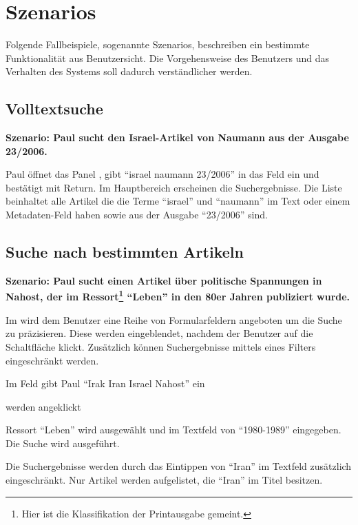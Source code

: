 

\chapter{Szenarios}

Folgende Fallbeispiele, sogenannte Szenarios, beschreiben ein bestimmte
Funktionalität aus Benutzersicht. Die Vorgehensweise des Benutzers und 
das Verhalten des Systems soll dadurch verständlicher werden.

\section{Volltextsuche}

\textbf{Szenario: Paul sucht den Israel-Artikel von Naumann aus der Ausgabe 23/2006.}

Paul öffnet das Panel , gibt "`israel naumann 23/2006"' in das Feld
 ein und bestätigt mit Return. Im Hauptbereich
erscheinen die Suchergebnisse. Die Liste beinhaltet alle Artikel die die Terme "`israel"' und
"`naumann"' im Text oder einem Metadaten-Feld haben sowie aus der Ausgabe
"`23/2006"' sind.


\section{Suche nach bestimmten Artikeln}

\textbf{Szenario: Paul sucht einen Artikel über politische Spannungen in Nahost, der im
Ressort\footnote{Hier ist die Klassifikation der Printausgabe gemeint.}
"`Leben"' in den 80er Jahren publiziert wurde.}

Im  wird dem Benutzer eine Reihe von
Formularfeldern angeboten um die Suche zu präzisieren. Diese werden
eingeblendet, nachdem der Benutzer auf die Schaltfläche
 klickt. Zusätzlich können Suchergebnisse
mittels eines Filters eingeschränkt werden.

\begin{compactenum}
  \item Im Feld  gibt Paul "`Irak Iran Israel
  Nahost"' ein
  \item {} werden angeklickt
  \item Ressort "`Leben"' wird ausgewählt und im Textfeld von
   "`1980-1989"' eingegeben. Die Suche wird ausgeführt.
  \item Die Suchergebnisse werden durch das Eintippen von "`Iran"' im
   Textfeld zusätzlich eingeschränkt. Nur Artikel
  werden aufgelistet, die "`Iran"' im Titel besitzen.
\end{compactenum}

